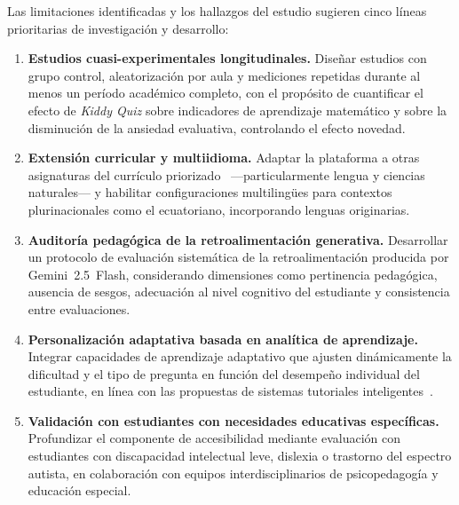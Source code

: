 Las limitaciones identificadas y los hallazgos del estudio sugieren cinco
líneas prioritarias de investigación y desarrollo:

\begin{enumerate}
    \item \textbf{Estudios cuasi-experimentales longitudinales.} Diseñar
    estudios con grupo control, aleatorización por aula y mediciones repetidas
    durante al menos un período académico completo, con el propósito de
    cuantificar el efecto de \textit{Kiddy Quiz} sobre indicadores de
    aprendizaje matemático y sobre la disminución de la ansiedad evaluativa,
    controlando el efecto novedad.

    \item \textbf{Extensión curricular y multiidioma.} Adaptar la plataforma a
    otras asignaturas del currículo priorizado~\cite{mineduc2021curriculo}
    ---particularmente lengua y ciencias naturales--- y habilitar
    configuraciones multilingües para contextos plurinacionales como el
    ecuatoriano, incorporando lenguas originarias.

    \item \textbf{Auditoría pedagógica de la retroalimentación generativa.}
    Desarrollar un protocolo de evaluación sistemática de la retroalimentación
    producida por Gemini~2.5~Flash, considerando dimensiones como pertinencia
    pedagógica, ausencia de sesgos, adecuación al nivel cognitivo del estudiante
    y consistencia entre evaluaciones.

    \item \textbf{Personalización adaptativa basada en analítica de
    aprendizaje.} Integrar capacidades de aprendizaje adaptativo que ajusten
    dinámicamente la dificultad y el tipo de pregunta en función del desempeño
    individual del estudiante, en línea con las propuestas de sistemas
    tutoriales inteligentes~\cite{mousavinasab2018its}.

    \item \textbf{Validación con estudiantes con necesidades educativas
    específicas.} Profundizar el componente de accesibilidad mediante
    evaluación con estudiantes con discapacidad intelectual leve, dislexia o
    trastorno del espectro autista, en colaboración con equipos
    interdisciplinarios de psicopedagogía y educación especial.
\end{enumerate}
